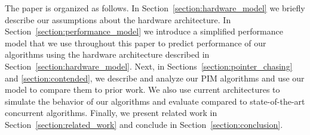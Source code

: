 The paper is organized as follows. In Section~\ref{section:hardware_model} we briefly describe 
our assumptions about the hardware architecture. 
In Section~\ref{section:performance_model} we introduce a simplified performance model 
that we use throughout this paper to predict performance of our algorithms using the hardware 
architecture described in Section~\ref{section:hardware_model}. 
Next, in Sections~\ref{section:pointer_chasing} and \ref{section:contended}, 
we describe and analyze our PIM algorithms and use our model to compare them to prior work. 
We also use current architectures to simulate the behavior of our algorithms and 
evaluate compared to state-of-the-art concurrent algorithms. 
Finally, we present related work in Section~\ref{section:related_work} 
and conclude in Section~\ref{section:conclusion}. 


